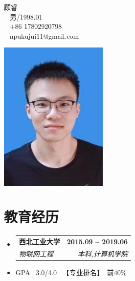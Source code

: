\documentclass[letterpaper,11pt]{article}
\makeatletter
\newcommand{\resumeItem}[1]{	
	\item\small{
		{#1 \vspace{-2pt}}
	}
}
\newcommand{\resumeSubheading}[4]{
	\vspace{-2pt}\item
	\begin{tabular*}{1.0\textwidth}[t]{l@{\extracolsep{\fill}}r}
		\textbf{\CJKfamily{STSong}#1} & \textbf{\small #2} \\
		\textit{\small\CJKfamily{KaiTi}#3} & \textit{\small #4} \\
	\end{tabular*}\vspace{-7pt}
	
}
\newcommand{\resumeSubHeadingListStart}{\begin{itemize}[leftmargin=0.0in, label={}]}
\newcommand{\resumeSubHeadingListEnd}{\end{itemize}}
\newcommand{\resumeItemListStart}{\begin{itemize}}
\newcommand{\resumeItemListEnd}{\end{itemize}\vspace{-5pt}}
\makeatother
\begin{document}
	\begin{flushleft}
		\begin{minipage}{0.6\textwidth}
			{\huge 顾\hspace{0.5em}睿} \\ 
			
			\vspace{14pt}
			{\small \raisebox{-0.2\height}\faUser ~ 男/1998.01} \\
			{\small \raisebox{-0.2\height}\faPhone ~ +86 17802920798} \\
			{\small \raisebox{-0.2\height}\faEnvelope ~ npukujui11@gmail.com} \\
		\end{minipage}
		\hfill %
		\begin{minipage}{0.3\textwidth}
			\hspace*{3cm}
			\includegraphics[width=0.4\textwidth]{picture/KuJui.jpg} %
		\end{minipage}
		\vspace{-16pt}
	\end{flushleft}
	
	\section{教育经历}
	
	\resumeSubHeadingListStart
	\resumeSubheading
	{西北工业大学}{2015.09 -- 2019.06}
	{物联网工程}{本科,计算机学院}
	\vspace{-2pt}
	\resumeSubHeadingListEnd
	
	\resumeItemListStart
	\resumeItem{GPA \ 3.0/4.0 \ 【专业排名】\ 前40\%}
	\resumeItemListEnd
	
	\vspace{-8pt}
	
\end{document}
